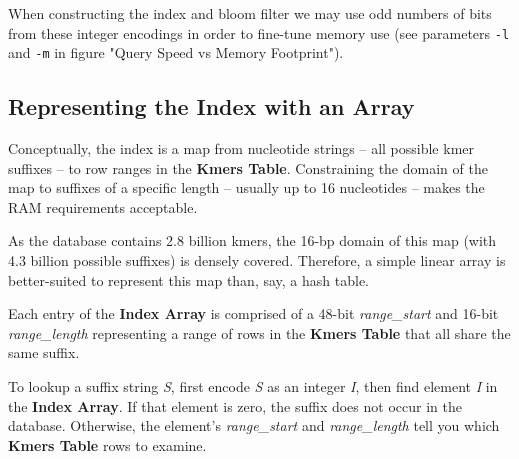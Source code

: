 \documentclass[10pt]{article}
\newcommand\figurebreak{}
\newcommand\KmersTable{\textbf{Kmers \hbox{Table}}}
\begin{document}
\figurebreak

When constructing the index and bloom filter we may use odd numbers of bits from these integer encodings in order to fine-tune memory use (see parameters \texttt{-l} and \texttt{-m} in figure "Query Speed vs Memory Footprint").

\pagebreak

\subsection{Representing the Index with an Array}


Conceptually, the index is a map from nucleotide strings -- all possible kmer suffixes -- to row ranges in the \KmersTable{}.  Constraining the domain of the map to suffixes of a specific length -- usually up to 16 nucleotides -- makes the RAM requirements acceptable.

As the database contains 2.8 billion kmers, the 16-bp domain of this map (with 4.3 billion possible suffixes) is densely covered.  Therefore, a simple linear array is better-suited to represent this map than, say, a hash table.

Each entry of the \textbf{Index Array} is comprised of a 48-bit \textsl{range_start} and 16-bit \textsl{range_length} representing a range of rows in the \KmersTable{} that all share the same suffix.

To lookup a suffix string \textsl{S}, first encode \textsl{S} as an integer \textsl{I}, then find element \textsl{I} in the \textbf{Index Array}.  If that element is zero, the suffix does not occur in the database. Otherwise, the element's \textsl{range_start} and \textsl{range_length} tell you which \KmersTable{} rows to examine.

\figurebreak
\end{document}
